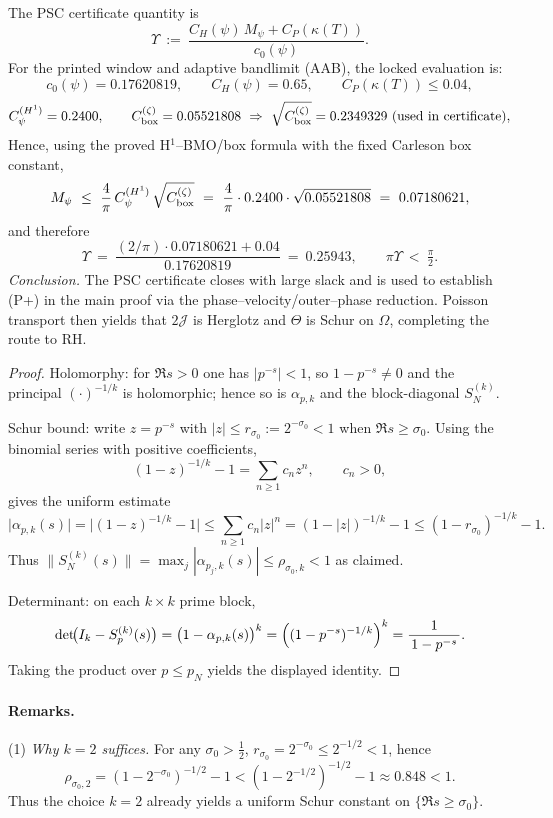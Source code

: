 \documentclass[11pt]{article}
\providecommand{\Mpsilocked}{0.07180621}%
\providecommand{\CPstar}{0.04}%
\providecommand{\UpsilonLocked}{0.25943}%
\theoremstyle{definition}
\theoremstyle{remark}
\begin{document}
The PSC certificate quantity is
\[
\Upsilon\ :=\ \frac{C_H(\psi)\,M_\psi + C_P(\kappa(T))}{c_0(\psi)}.
\]
For the printed window and adaptive bandlimit (AAB), the locked evaluation is:
\[
c_0(\psi)=0.17620819,\qquad C_H(\psi)=0.65,\qquad C_P(\kappa(T))\le\CPstar,
\]
\[
C_\psi^{(H^1)}=0.2400,\qquad C_{\rm box}^{(\zeta)}=0.05521808\ \Rightarrow\ \sqrt{C_{\rm box}^{(\zeta)}}=0.2349329\,\,\text{(used in certificate)},
\]
Hence, using the proved H$^1$--BMO/box formula with the fixed Carleson box constant,
\[
M_\psi\ \le\ \frac{4}{\pi}\,C_\psi^{(H^1)}\,\sqrt{C_{\rm box}^{(\zeta)}}\ =\ \frac{4}{\pi}\cdot 0.2400 \cdot \sqrt{0.05521808}\ =\ \Mpsilocked,
\]
and therefore
\[
\Upsilon\ =\ \frac{(2/\pi)\cdot \Mpsilocked + \CPstar}{0.17620819}\ =\ \UpsilonLocked,\qquad
\pi\Upsilon\ <\ \tfrac{\pi}{2}.\]
\emph{Conclusion.} The PSC certificate closes with large slack and is used to establish (P+) in the main proof via the phase--velocity/outer--phase reduction. Poisson transport then yields that $2\mathcal J$ is Herglotz and $\Theta$ is Schur on $\Omega$, completing the route to RH.
\begin{proof}
Holomorphy: for $\Re s>0$ one has $|p^{-s}|<1$, so $1-p^{-s}\neq 0$ and the principal $(\cdot)^{-1/k}$ is holomorphic; hence so is $\alpha_{p,k}$ and the block-diagonal $S_{N}^{(k)}$.

Schur bound: write $z=p^{-s}$ with $|z|\le r_{\sigma_0}:=2^{-\sigma_0}<1$ when $\Re s\ge \sigma_0$. Using the binomial series with positive coefficients,
\[
 (1-z)^{-1/k}-1=\sum_{n\ge 1} c_n z^n,\qquad c_n>0,
\]
gives the uniform estimate
\[
 \bigl|\alpha_{p,k}(s)\bigr|=\bigl|(1-z)^{-1/k}-1\bigr|\le \sum_{n\ge 1} c_n |z|^n
= (1-|z|)^{-1/k}-1 \le (1-r_{\sigma_0})^{-1/k}-1.
\]
Thus $\|S_{N}^{(k)}(s)\|=\max_{j}|\alpha_{p_j,k}(s)|\le \rho_{\sigma_0,k}<1$ as claimed.

Determinant: on each $k\times k$ prime block,
\[
 \det\!\bigl(I_k-S_{p}^{(k)}(s)\bigr)=\bigl(1-\alpha_{p,k}(s)\bigr)^{k}=\Bigl((1-p^{-s})^{-1/k}\Bigr)^{k}=\frac{1}{\,1-p^{-s}\,}.
\]
Taking the product over $p\le p_N$ yields the displayed identity.
\end{proof}
\paragraph{Remarks.}
(1) \emph{Why $k=2$ suffices.} For any $\sigma_0>\tfrac12$, $r_{\sigma_0}=2^{-\sigma_0}\le 2^{-1/2}<1$, hence
\[
 \rho_{\sigma_0,2}=(1-2^{-\sigma_0})^{-1/2}-1<(1-2^{-1/2})^{-1/2}-1\approx 0.848<1.
\]
Thus the choice $k=2$ already yields a uniform Schur constant on $\{\Re s\ge \sigma_0\}$.
\end{document}
